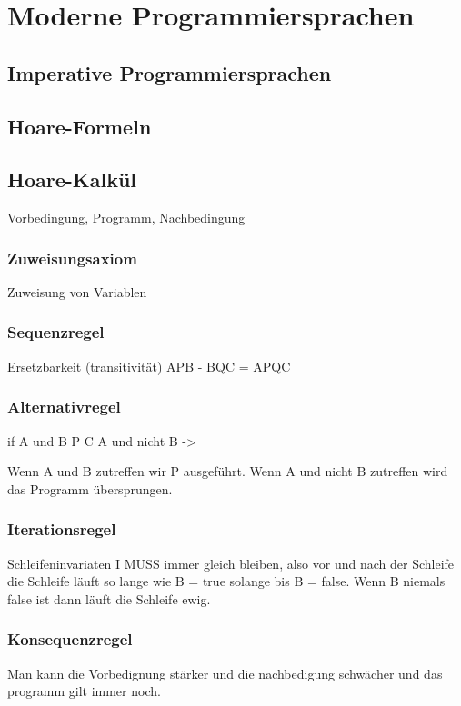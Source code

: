 \chapter{Moderne Programmiersprachen}
\section{Imperative Programmiersprachen}
\section{Hoare-Formeln}
\section{Hoare-Kalkül}

Vorbedingung, Programm, Nachbedingung\\

\subsection{Zuweisungsaxiom}
Zuweisung von Variablen\\

\subsection{Sequenzregel}
Ersetzbarkeit (transitivität) A{P}B - B{Q}C = A{PQ}C

\subsection{Alternativregel}
if
A und B {P} C
A und nicht B ->

Wenn A und B zutreffen wir P ausgeführt. Wenn A und nicht B zutreffen wird das Programm übersprungen.

\subsection{Iterationsregel}
Schleifeninvariaten I MUSS immer gleich bleiben, also vor und nach der Schleife 
die Schleife läuft so lange wie B = true solange bis B = false. Wenn B niemals false ist dann läuft die Schleife ewig.

\subsection{Konsequenzregel}
Man kann die Vorbedignung stärker und die nachbedigung schwächer und das programm gilt immer noch.

